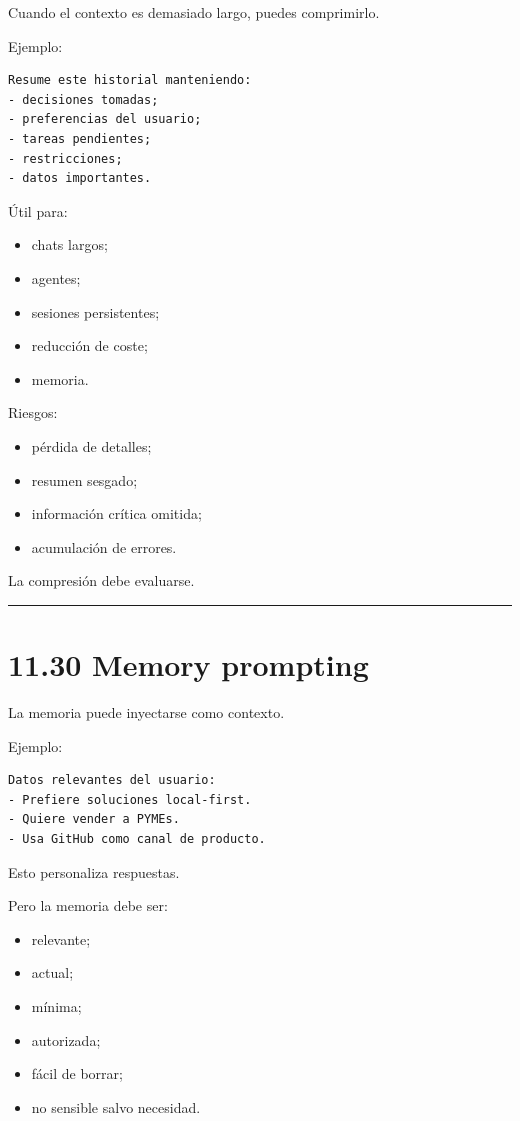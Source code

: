 Cuando el contexto es demasiado largo, puedes comprimirlo.

Ejemplo:

\begin{lstlisting}
Resume este historial manteniendo:
- decisiones tomadas;
- preferencias del usuario;
- tareas pendientes;
- restricciones;
- datos importantes.
\end{lstlisting}

Útil para:

\begin{itemize}
\tightlist
\item
  chats largos;
\item
  agentes;
\item
  sesiones persistentes;
\item
  reducción de coste;
\item
  memoria.
\end{itemize}

Riesgos:

\begin{itemize}
\tightlist
\item
  pérdida de detalles;
\item
  resumen sesgado;
\item
  información crítica omitida;
\item
  acumulación de errores.
\end{itemize}

La compresión debe evaluarse.

\begin{center}\rule{0.5\linewidth}{0.5pt}\end{center}

\section{11.30 Memory prompting}\label{memory-prompting}

La memoria puede inyectarse como contexto.

Ejemplo:

\begin{lstlisting}
Datos relevantes del usuario:
- Prefiere soluciones local-first.
- Quiere vender a PYMEs.
- Usa GitHub como canal de producto.
\end{lstlisting}

Esto personaliza respuestas.

Pero la memoria debe ser:

\begin{itemize}
\tightlist
\item
  relevante;
\item
  actual;
\item
  mínima;
\item
  autorizada;
\item
  fácil de borrar;
\item
  no sensible salvo necesidad.
\end{itemize}

